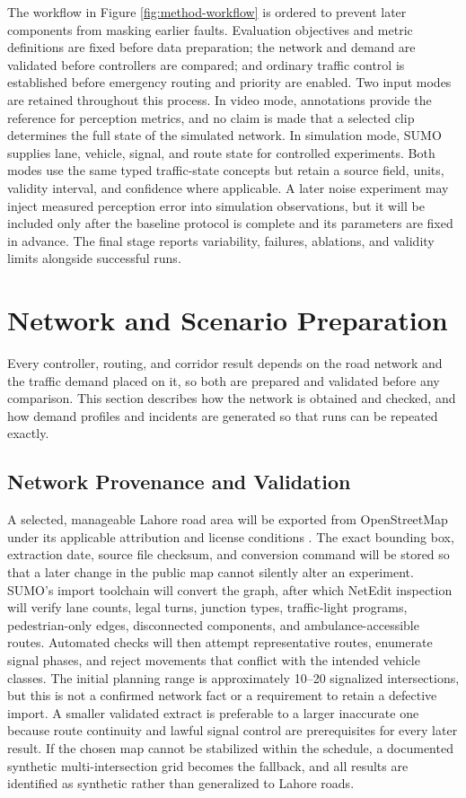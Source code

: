 The workflow in Figure \ref{fig:method-workflow} is ordered to prevent later components from masking earlier faults. Evaluation objectives and metric definitions are fixed before data preparation; the network and demand are validated before controllers are compared; and ordinary traffic control is established before emergency routing and priority are enabled. Two input modes are retained throughout this process. In video mode, annotations provide the reference for perception metrics, and no claim is made that a selected clip determines the full state of the simulated network. In simulation mode, SUMO supplies lane, vehicle, signal, and route state for controlled experiments. Both modes use the same typed traffic-state concepts but retain a source field, units, validity interval, and confidence where applicable. A later noise experiment may inject measured perception error into simulation observations, but it will be included only after the baseline protocol is complete and its parameters are fixed in advance. The final stage reports variability, failures, ablations, and validity limits alongside successful runs.

\section{Network and Scenario Preparation}

Every controller, routing, and corridor result depends on the road network and the traffic demand placed on it, so both are prepared and validated before any comparison. This section describes how the network is obtained and checked, and how demand profiles and incidents are generated so that runs can be repeated exactly.

\subsection{Network Provenance and Validation}

A selected, manageable Lahore road area will be exported from OpenStreetMap under its applicable attribution and license conditions \cite{osmlicense}. The exact bounding box, extraction date, source file checksum, and conversion command will be stored so that a later change in the public map cannot silently alter an experiment. SUMO's import toolchain will convert the graph, after which NetEdit inspection will verify lane counts, legal turns, junction types, traffic-light programs, pedestrian-only edges, disconnected components, and ambulance-accessible routes. Automated checks will then attempt representative routes, enumerate signal phases, and reject movements that conflict with the intended vehicle classes. The initial planning range is approximately 10--20 signalized intersections, but this is not a confirmed network fact or a requirement to retain a defective import. A smaller validated extract is preferable to a larger inaccurate one because route continuity and lawful signal control are prerequisites for every later result. If the chosen map cannot be stabilized within the schedule, a documented synthetic multi-intersection grid becomes the fallback, and all results are identified as synthetic rather than generalized to Lahore roads.

